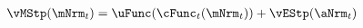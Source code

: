   \begin{equation}\begin{gathered}\begin{aligned}
\vMStp(\mNrm_{t}) & = \uFunc(\cFunc_{t}(\mNrm_{t})) + \vEStp(\aNrm_{t}) \label{eq:vMStp}
      \end{aligned}\end{gathered}\end{equation}
